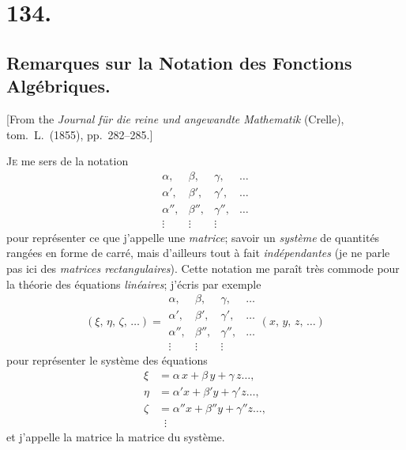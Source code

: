 \documentclass[11pt,a4paper]{book}
\begin{document}
\section*{134.}
\subsection*{Remarques sur la Notation des Fonctions Alg\'ebriques.}

[From the \textit{Journal f\"ur die reine und angewandte Mathematik} (Crelle),
tom.\ L.\ (1855), pp.\ 282--285.]

\medskip

\textsc{Je} me sers de la notation
\[
\begin{array}{cccc}
\alpha, & \beta, & \gamma, & \ldots \\
\alpha', & \beta', & \gamma', & \ldots \\
\alpha'', & \beta'', & \gamma'', & \ldots \\
\vdots & \vdots & \vdots &
\end{array}
\]
pour repr\'esenter ce que j'appelle une \textit{matrice}; savoir un
\textit{syst\`eme} de quantit\'es rang\'ees en forme de carr\'e, mais
d'ailleurs tout \`a fait \textit{ind\'ependantes} (je ne parle pas ici des
\textit{matrices rectangulaires}). Cette notation me para\^it tr\`es commode
pour la th\'eorie des \'equations \textit{lin\'eaires}; j'\'ecris par exemple
\[
(\xi,\, \eta,\, \zeta,\, \ldots) =
\begin{array}{|cccc|}
\alpha, & \beta, & \gamma, & \ldots \\
\alpha', & \beta', & \gamma', & \ldots \\
\alpha'', & \beta'', & \gamma'', & \ldots \\
\vdots & \vdots & \vdots &
\end{array}
(x,\, y,\, z,\, \ldots)
\]
pour repr\'esenter le syst\`eme des \'equations
\begin{align*}
\xi &= \alpha\,x + \beta\,y + \gamma\,z\ldots, \\
\eta &= \alpha' x + \beta' y + \gamma' z\ldots, \\
\zeta &= \alpha'' x + \beta'' y + \gamma'' z\ldots, \\
& \;\;\vdots
\end{align*}
et j'appelle la matrice la matrice du syst\`eme.

\medskip
\end{document}
